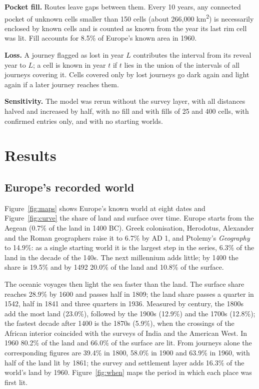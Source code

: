\documentclass[11pt,a4paper]{article}
\begin{document}
\textbf{Pocket fill.} Routes leave gaps between them. Every 10 years, any connected pocket of unknown cells smaller than 150 cells (about 266,000 km\textsuperscript{2}) is necessarily enclosed by known cells and is counted as known from the year its last rim cell was lit. Fill accounts for 8.5\% of Europe's known area in 1960.

\textbf{Loss.} A journey flagged as lost in year $L$ contributes the interval from its reveal year to $L$; a cell is known in year $t$ if $t$ lies in the union of the intervals of all journeys covering it. Cells covered only by lost journeys go dark again and light again if a later journey reaches them.

\textbf{Sensitivity.} The model was rerun without the survey layer, with all distances halved and increased by half, with no fill and with fills of 25 and 400 cells, with confirmed entries only, and with no starting worlds.

\section{Results}
\subsection{Europe's recorded world}
Figure~\ref{fig:maps} shows Europe's known world at eight dates and Figure~\ref{fig:curve} the share of land and surface over time. Europe starts from the Aegean (0.7\% of the land in 1400 BC). Greek colonisation, Herodotus, Alexander and the Roman geographers raise it to 6.7\% by AD 1, and Ptolemy's \textit{Geography} to 14.9\%: as a single starting world it is the largest step in the series, 6.3\% of the land in the decade of the 140s. The next millennium adds little; by 1400 the share is 19.5\% and by 1492 20.0\% of the land and 10.8\% of the surface.

The oceanic voyages then light the sea faster than the land. The surface share reaches 28.9\% by 1600 and passes half in 1809; the land share passes a quarter in 1542, half in 1841 and three quarters in 1936. Measured by century, the 1800s add the most land (23.0\%), followed by the 1900s (12.9\%) and the 1700s (12.8\%); the fastest decade after 1400 is the 1870s (5.9\%), when the crossings of the African interior coincided with the surveys of India and the American West. In 1960 80.2\% of the land and 66.0\% of the surface are lit. From journeys alone the corresponding figures are 39.4\% in 1800, 58.0\% in 1900 and 63.9\% in 1960, with half of the land lit by 1861; the survey and settlement layer adds 16.3\% of the world's land by 1960. Figure~\ref{fig:when} maps the period in which each place was first lit.
\end{document}
